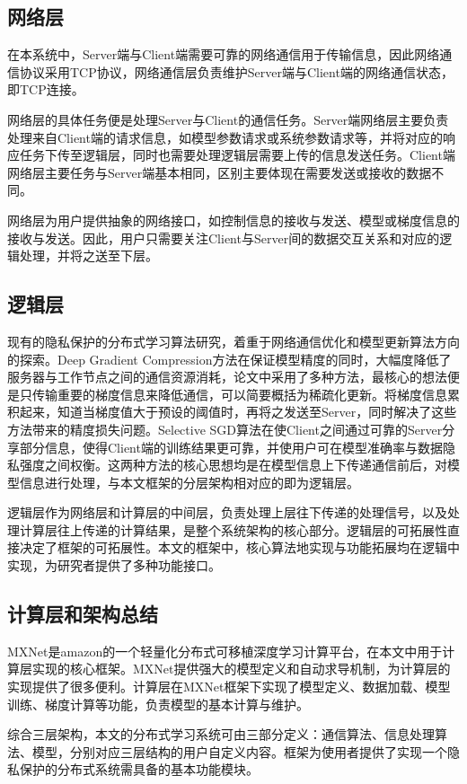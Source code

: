 \documentclass[zihao = -4,cn]{oucart}
\begin{document}
\subsection{网络层}
在本系统中，Server端与Client端需要可靠的网络通信用于传输信息，因此网络通信协议采用TCP协议，网络通信层负责维护Server端与Client端的网络通信状态，即TCP连接。\par
网络层的具体任务便是处理Server与Client的通信任务。Server端网络层主要负责处理来自Client端的请求信息，如模型参数请求或系统参数请求等，并将对应的响应任务下传至逻辑层，同时也需要处理逻辑层需要上传的信息发送任务。Client端网络层主要任务与Server端基本相同，区别主要体现在需要发送或接收的数据不同。\par
网络层为用户提供抽象的网络接口，如控制信息的接收与发送、模型或梯度信息的接收与发送。因此，用户只需要关注Client与Server间的数据交互关系和对应的逻辑处理，并将之送至下层。\par
\subsection{逻辑层}
现有的隐私保护的分布式学习算法研究，着重于网络通信优化和模型更新算法方向的探索。Deep Gradient Compression\cite{lin2017deep}方法在保证模型精度的同时，大幅度降低了服务器与工作节点之间的通信资源消耗，论文中采用了多种方法，最核心的想法便是只传输重要的梯度信息来降低通信，可以简要概括为稀疏化更新。将梯度信息累积起来，知道当梯度值大于预设的阈值时，再将之发送至Server，同时解决了这些方法带来的精度损失问题。Selective SGD\cite{shokri2015privacy}算法在使Client之间通过可靠的Server分享部分信息，使得Client端的训练结果更可靠，并使用户可在模型准确率与数据隐私强度之间权衡。这两种方法的核心思想均是在模型信息上下传递通信前后，对模型信息进行处理，与本文框架的分层架构相对应的即为逻辑层。\par
逻辑层作为网络层和计算层的中间层，负责处理上层往下传递的处理信号，以及处理计算层往上传递的计算结果，是整个系统架构的核心部分。逻辑层的可拓展性直接决定了框架的可拓展性。本文的框架中，核心算法地实现与功能拓展均在逻辑中实现，为研究者提供了多种功能接口。\par
\subsection{计算层和架构总结}
MXNet是amazon的一个轻量化分布式可移植深度学习计算平台，在本文中用于计算层实现的核心框架。MXNet提供强大的模型定义和自动求导机制，为计算层的实现提供了很多便利。计算层在MXNet框架下实现了模型定义、数据加载、模型训练、梯度计算等功能，负责模型的基本计算与维护。\par
综合三层架构，本文的分布式学习系统可由三部分定义：通信算法、信息处理算法、模型，分别对应三层结构的用户自定义内容。框架为使用者提供了实现一个隐私保护的分布式系统需具备的基本功能模块。\par
\end{document}
